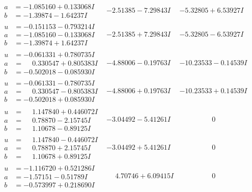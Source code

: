 \documentclass[1p]{elsarticle_modified}
\theoremstyle{definition}
\begin{document}
$$\begin{array}{c|c|c}
\begin{aligned}
a &= -1.085160 + 0.133068 I \\
b &= -1.39874 - 1.64237 I\end{aligned}
 & -2.51385 - 7.29843 I & -5.32805 + 6.53927 I \\ \hline\begin{aligned}
u &= -0.151153 - 0.793214 I \\
a &= -1.085160 - 0.133068 I \\
b &= -1.39874 + 1.64237 I\end{aligned}
 & -2.51385 + 7.29843 I & -5.32805 - 6.53927 I \\ \hline\begin{aligned}
u &= -0.061331 + 0.780735 I \\
a &= \phantom{-}0.330547 + 0.805383 I \\
b &= -0.502018 - 0.085930 I\end{aligned}
 & -4.88006 - 0.19763 I & -10.23533 - 0.14539 I \\ \hline\begin{aligned}
u &= -0.061331 - 0.780735 I \\
a &= \phantom{-}0.330547 - 0.805383 I \\
b &= -0.502018 + 0.085930 I\end{aligned}
 & -4.88006 + 0.19763 I & -10.23533 + 0.14539 I \\ \hline\begin{aligned}
u &= \phantom{-}1.147840 + 0.446072 I \\
a &= \phantom{-}0.78870 - 2.15745 I \\
b &= \phantom{-}1.10678 - 0.89125 I\end{aligned}
 & -3.04492 - 5.41261 I & \phantom{-0.000000 } 0 \\ \hline\begin{aligned}
u &= \phantom{-}1.147840 - 0.446072 I \\
a &= \phantom{-}0.78870 + 2.15745 I \\
b &= \phantom{-}1.10678 + 0.89125 I\end{aligned}
 & -3.04492 + 5.41261 I & \phantom{-0.000000 } 0 \\ \hline\begin{aligned}
u &= -1.116720 + 0.521286 I \\
a &= -1.57151 - 0.51789 I \\
b &= -0.573997 + 0.218690 I\end{aligned}
 & \phantom{-}4.70746 + 6.09415 I & \phantom{-0.000000 } 0 \\ \hline\begin{aligned}

\end{aligned}
\end{array}$$
\end{document}
